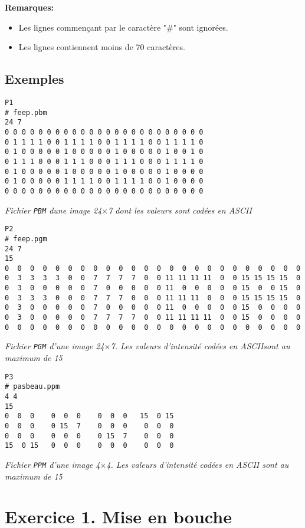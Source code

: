 \documentclass[a4paper, 11pt, french]{article}
\begin{document}
\noindent \textbf{Remarques:}
\begin{itemize}
	\item Les lignes commençant par le caractère "\#" sont ignorées.
	\item Les lignes contiennent moins de 70 caractères.
\end{itemize}


\subsection*{Exemples}

\begin{verbatim}
P1
# feep.pbm
24 7
0 0 0 0 0 0 0 0 0 0 0 0 0 0 0 0 0 0 0 0 0 0 0 0
0 1 1 1 1 0 0 1 1 1 1 0 0 1 1 1 1 0 0 1 1 1 1 0
0 1 0 0 0 0 0 1 0 0 0 0 0 1 0 0 0 0 0 1 0 0 1 0
0 1 1 1 0 0 0 1 1 1 0 0 0 1 1 1 0 0 0 1 1 1 1 0
0 1 0 0 0 0 0 1 0 0 0 0 0 1 0 0 0 0 0 1 0 0 0 0
0 1 0 0 0 0 0 1 1 1 1 0 0 1 1 1 1 0 0 1 0 0 0 0
0 0 0 0 0 0 0 0 0 0 0 0 0 0 0 0 0 0 0 0 0 0 0 0
\end{verbatim}
{\it Fichier \texttt{PBM} dune image  24$\times$7 dont les valeurs sont codées en ASCII}
\begin{verbatim}
P2
# feep.pgm
24 7
15
0  0  0  0  0  0  0  0  0  0  0  0  0  0  0  0  0  0  0  0  0  0  0  0
0  3  3  3  3  0  0  7  7  7  7  0  0 11 11 11 11  0  0 15 15 15 15  0
0  3  0  0  0  0  0  7  0  0  0  0  0 11  0  0  0  0  0 15  0  0 15  0
0  3  3  3  0  0  0  7  7  7  0  0  0 11 11 11  0  0  0 15 15 15 15  0
0  3  0  0  0  0  0  7  0  0  0  0  0 11  0  0  0  0  0 15  0  0  0  0
0  3  0  0  0  0  0  7  7  7  7  0  0 11 11 11 11  0  0 15  0  0  0  0
0  0  0  0  0  0  0  0  0  0  0  0  0  0  0  0  0  0  0  0  0  0  0  0
\end{verbatim}
{\it Fichier \texttt{PGM} d'une image  24$\times$7. Les valeurs d'intensité codées en ASCII\newline sont au maximum de 15}
\begin{verbatim} 
P3
# pasbeau.ppm
4 4
15
0  0  0    0  0  0    0  0  0   15  0 15
0  0  0    0 15  7    0  0  0    0  0  0
0  0  0    0  0  0    0 15  7    0  0  0
15  0 15   0  0  0    0  0  0    0  0  0
\end{verbatim}
{\it Fichier \texttt{PPM} d'une image  4$\times$4. Les valeurs d'intensité codées en ASCII  sont au maximum de 15}


\newpage
\section*{\bf Exercice 1. \rm Mise en bouche}
\end{document}
